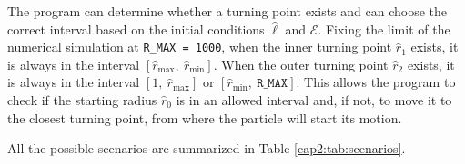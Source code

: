 The program can determine whether a turning point exists and can choose the correct
interval based on the initial conditions $ \hat{\ell} $ and $ \mathcal{E} $.
Fixing the limit of the numerical simulation at \texttt{R\_MAX = 1000}, when the
inner turning point $ \hat{r}_1 $ exists, it is always in the interval 
$[\hat{r}_{\text{max}}, ~ \hat{r}_{\text{min}}]$.
When the outer turning point $ \hat{r}_2 $ exists, it is always in the interval 
$[1, ~ \hat{r}_{\text{max}}]$ or $[\hat{r}_{\text{min}}, ~ \texttt{R\_MAX}]$.
This allows the program to check if the starting radius $ \hat{r}_0 $ is in an
allowed interval and, if not, to move it to the closest turning point, from
where the particle will start its motion.

All the possible scenarios are summarized in Table \ref{cap2:tab:scenarios}.


